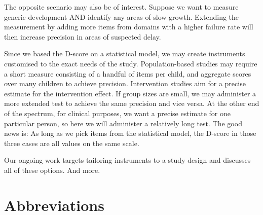 \documentclass[
]{book}
\begin{document}
The opposite scenario may also be of interest. Suppose we want to measure generic development AND identify any areas of slow growth. Extending the measurement by adding more items from domains with a higher failure rate will then increase precision in areas of suspected delay.

Since we based the D-score on a statistical model, we may create instruments customised to the exact needs of the study. Population-based studies may require a short measure consisting of a handful of items per child, and aggregate scores over many children to achieve precision. Intervention studies aim for a precise estimate for the intervention effect. If group sizes are small, we may administer a more extended test to achieve the same precision and vice versa. At the other end of the spectrum, for clinical purposes, we want a precise estimate for one particular person, so here we will administer a relatively long test. The good news is: As long as we pick items from the statistical model, the D-score in those three cases are all values on the same scale.

Our ongoing work targets tailoring instruments to a study design and discusses all of these options. And more.

\hypertarget{appendix-appendices}{%
\appendix}


\hypertarget{ap:abbreviations}{%
\chapter{Abbreviations}\label{ap:abbreviations}}
\end{document}
